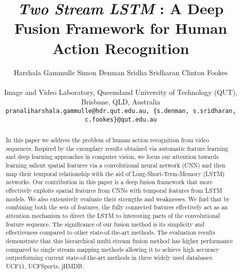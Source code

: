 \documentclass[10pt,twocolumn,letterpaper]{article}
\begin{document}
\title{\textit{Two Stream LSTM} : A Deep Fusion Framework for Human Action Recognition}


\author{Harshala Gammulle \hspace{1cm} Simon Denman \hspace{1cm} Sridha Sridharan \hspace{1cm} Clinton Fookes\\
\\Image and Video Laboratory, Queensland University of Technology (QUT), Brisbane, QLD, Australia\\
{\tt\small pranaliharshala.gammulle@hdr.qut.edu.au, \{s.denman, s.sridharan, c.fookes\}@qut.edu.au}
}


\maketitle
\ifwacvfinal\thispagestyle{empty}\fi

\begin{abstract}
   In this paper we address the problem of human action recognition from video sequences. Inspired by the exemplary results obtained via automatic feature learning and deep learning approaches in computer vision, we focus our attention towards learning salient spatial features via a convolutional neural network (CNN) and then map their temporal relationship with the aid of Long-Short-Term-Memory (LSTM) networks. Our contribution in this paper is a deep fusion framework that more effectively exploits spatial features from CNNs with temporal features from LSTM models. We also extensively evaluate their strengths and weaknesses. We find that by combining both the sets of features, the fully connected features effectively act as an attention mechanism to direct the LSTM to interesting parts of the convolutional feature sequence. The significance of our fusion method is its simplicity and effectiveness compared to other state-of-the-art methods. The evaluation results demonstrate that this hierarchical multi stream fusion method has higher performance compared to single stream mapping methods allowing it to achieve high accuracy outperforming current state-of-the-art methods in three widely used databases: UCF11, UCFSports, jHMDB.
\end{abstract}
\end{document}
